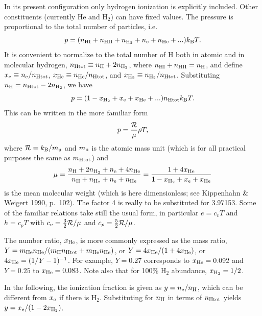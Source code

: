 \documentclass[\mydriver,12pt,twoside,notitlepage,a4paper]{article}
\begin{document}
In its present configuration only hydrogen ionization is explicitly included.
Other constituents (currently He and H$_2$) can have fixed values.
The pressure is proportional to the total number of particles, i.e.\
\begin{equation}
p=(n_{\rm HI}+n_{\rm HII}+n_{\rm H_2}+n_{\rm e}+n_{\rm He}+...)k_{\rm B}T.
\end{equation}
It is convenient to normalize to the total number of H both in atomic
and in molecular hydrogen, $n_{\rm Htot}\equiv n_{\rm H}+2n_{\rm H_2}$,
where $n_{\rm HI}+n_{\rm HII}=n_{\rm H}$, and define
$x_{\rm e}\equiv n_{\rm e}/n_{\rm Htot}$,
$x_{\rm He}\equiv n_{\rm He}/n_{\rm Htot}$, and
$x_{\rm H_2}\equiv n_{\rm H_2}/n_{\rm Htot}$.
Substituting $n_{\rm H}=n_{\rm Htot}-2n_{\rm H_2}$, we have
\begin{equation}
p=(1-x_{\rm H_2}+x_{\rm e}+x_{\rm He}+...)n_{\rm Htot}k_{\rm B}T.
\end{equation}
This can be written in the more familiar form
\begin{equation}
p={{\cal R}\over\mu}\rho T,
\end{equation}
where ${\cal R}=k_{\rm B}/m_{\rm u}$ and
$m_{\rm u}$ is the atomic mass unit (which is for all practical
purposes the same as $m_{\rm Htot}$) and
\begin{equation}
\mu={n_{\rm H}+2n_{\rm H_2}+n_{\rm e}+4n_{\rm He}\over
n_{\rm H}+n_{\rm H_2}+n_{\rm e}+n_{\rm He}}
={1+4x_{\rm He}\over1-x_{\rm H_2}+x_{\rm e}+x_{\rm He}}
\end{equation}
is the mean molecular weight (which is here dimensionless; see
Kippenhahn \& Weigert 1990, p.\ 102).
The factor 4 is really to be substituted for 3.97153.
Some of the familiar relations take still the usual form, in particular
$e=c_vT$ and $h=c_pT$ with $c_v={3\over2}{\cal R}/\mu$ and
$c_p={5\over2}{\cal R}/\mu$.

The number ratio, $x_{\rm He}$, is more commonly expressed as the mass
ratio, $Y=m_{\rm He}n_{\rm He}/(m_{\rm H}n_{\rm Htot}+m_{\rm He}n_{\rm He})$,
or $Y=4x_{\rm He}/(1+4x_{\rm He})$, or $4x_{\rm He}=(1/Y-1)^{-1}$.
For example, $Y=0.27$ corresponds to $x_{\rm He}=0.092$
and $Y=0.25$ to $x_{\rm He}=0.083$.
Note also that for 100\% H$_2$ abundance, $x_{\rm H_2}=1/2$.

In the following, the ionization fraction is given as $y=n_{\rm e}/n_{\rm H}$,
which can be different from $x_{\rm e}$ if there is H$_2$.
Substituting for $n_{\rm H}$ in terms of $n_{\rm Htot}$ yields
$y=x_{\rm e}/(1-2x_{\rm H_2})$.
\end{document}
